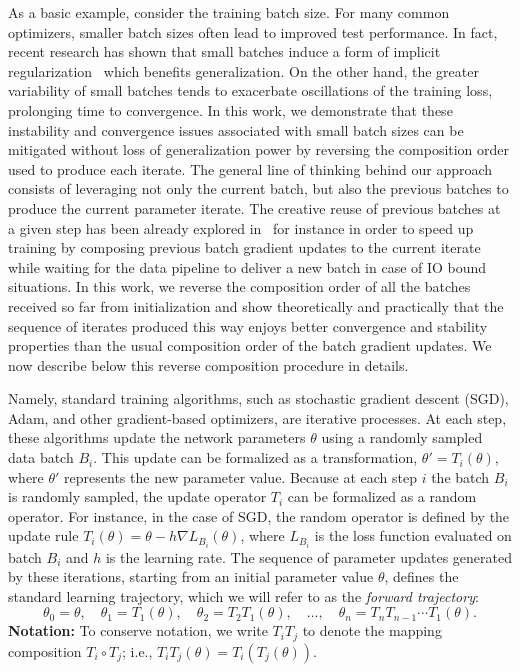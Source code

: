 \documentclass[10pt]{article} %
\theoremstyle{plain}
\theoremstyle{definition}
\theoremstyle{remark}
\begin{document}
As a basic example, consider the training batch size. For many common optimizers, smaller batch sizes often lead to improved test performance. In fact, recent research has shown that small batches induce a form of implicit regularization~\cite{Novack2023Disentangling,smith2021on,dherin2022why,keskar2017large,ali2020implicit} which benefits generalization. On the other hand, the greater variability of small batches tends to exacerbate oscillations of the training loss, prolonging time to convergence. In this work, we demonstrate that these instability and convergence issues associated with small batch sizes can be mitigated without loss of generalization power by reversing the composition order used to produce each iterate. The general line of thinking behind our approach consists of leveraging not only the current batch, but also the previous batches to produce the current parameter iterate. The creative reuse of previous batches at a given step has been already explored in~\cite{Choi2019FasterNN} for instance in order to speed up training by composing previous batch gradient updates to the current iterate while waiting for the data pipeline to deliver a new batch in case of IO bound situations. In this work, we reverse the composition order of all the batches received so far from initialization and show theoretically and practically that the sequence of iterates produced this way enjoys better convergence and stability properties than the usual composition order of the batch gradient updates. We now describe below this reverse composition procedure in details.

Namely, standard training algorithms, such as stochastic gradient descent (SGD), Adam, and other gradient-based optimizers, are iterative processes.  At each step, these algorithms update the network parameters $\theta$ using a randomly sampled data batch $B_i$.  This update can be formalized as a transformation, $\theta' = T_i(\theta)$, where $\theta'$ represents the new parameter value. 
Because at each step $i$ the batch $B_i$ is randomly sampled, the update operator $T_i$ can be formalized as a random operator.  For instance, in the case of SGD, the random operator is defined by the update rule $T_i(\theta) = \theta - h \nabla L_{B_i}(\theta)$, where $L_{B_i}$ is the loss function evaluated on batch $B_i$ and $h$ is the learning rate.  The sequence of parameter updates generated by these iterations, starting from an initial parameter value $\theta$, defines the standard learning trajectory, which we will refer to as the \emph{forward trajectory}:
\begin{equation*}
    \theta_0 = \theta,\quad 
    \theta_1 = T_1(\theta), \quad 
    \theta_2 = T_2T_1(\theta),\quad \dots, \quad  
    \theta_n = T_n T_{n-1} \cdots T_1(\theta).
\end{equation*}
{\bf Notation:} To conserve notation, we  write $T_i T_j$ to denote the mapping composition $T_i \circ T_j$; i.e., $T_i T_j(\theta) = T_i(T_j(\theta))$.
\end{document}
